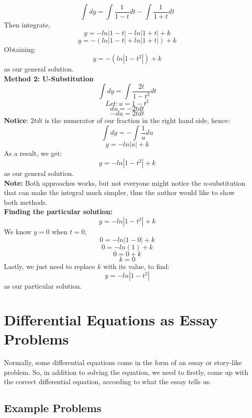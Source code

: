 \documentclass[hidelinks, a4paper, 12pt]{article}
\begin{document}
                    \[\int dy = \int \frac{1}{1-t}dt - \int \frac{1}{1+t}dt\]
                    Then integrate,
                    \[y = -ln|1-t| - ln|1+t| + k\]
                    \[y = -(ln|1-t| + ln|1+t|) + k\]
                    Obtaining:
                    \[y = -(ln|1-t^2|) + k\]
                    as our general solution.\\[2\baselineskip]
                \textbf{Method 2: U-Substitution}
                    \[\int dy = \int \frac{2t}{1-t^2}dt\]
                    \[Let: u = 1-t^2\]
                    \[du = -2tdt\]
                    \[-du = 2tdt\]
                    \textbf{Notice}: $2tdt$ is the numerator of our fraction in the right hand side, hence:
                    \[\int dy = -\int \frac{1}{u}du\]
                    \[y = -ln|u| + k\]
                    As a result, we get:
                    \[y = -ln|1-t^2| + k\]
                    as our general solution.\\[2\baselineskip]
                    \textbf{Note:} Both approaches works, but not everyone might notice the u-substitution that
                    can make the integral much simpler, thus the author would like to show both methods.\\[2\baselineskip] 
                \textbf{Finding the particular solution:}
                    \[y = -ln|1-t^2| + k\]
                    We know $y = 0$ when $t = 0$,
                    \[0 = -ln|1-0| + k\]
                    \[0 = -ln(1) + k\]
                    \[0 = 0 + k\]
                    \[k = 0\]
                    Lastly, we just need to replace $k$ with its value, to find:
                    \[y = -ln|1-t^2|\]
                    as our particular solution.
    \section{Differential Equations as Essay Problems}
        Normally, some differential equations come in the form of an essay or story-like problem. So, in addition
        to solving the equation, we need to firstly, come up with the correct differential equation, according to
        what the essay tells us.
        \subsection{Example Problems}
\end{document}
